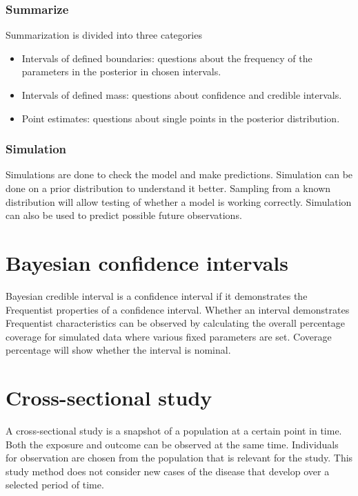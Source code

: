 \subsubsection*{Summarize}

Summarization is divided into three categories

\begin{itemize}
    \item Intervals of defined boundaries: questions about the frequency of the parameters in the posterior in chosen intervals.
    \item Intervals of defined mass: questions about confidence and credible intervals. 
    \item Point estimates: questions about single points in the posterior distribution.
\end{itemize}

\subsubsection*{Simulation}

Simulations are done to check the model and make predictions. Simulation can be done on a prior distribution to understand it better. Sampling from a known distribution will allow testing of whether a model is working correctly. Simulation can also be used to predict possible future observations. \cite{Mcelreath2015StatisticalRA}

\section{Bayesian confidence intervals}\label{BayesianConfidenceIntervals}

Bayesian credible interval is a confidence interval if it demonstrates the Frequentist properties of a confidence interval. Whether an interval demonstrates Frequentist characteristics can be observed by calculating the overall percentage coverage for simulated data where various fixed parameters are set. \cite{Pirikahu2016BayesianMO} \cite{Shi2009BayesianCI} Coverage percentage will show whether the interval is nominal. \cite{Pirikahu2016BayesianMO} 

\section{Cross-sectional study}\label{CrossSectionalStudy}

A cross-sectional study is a snapshot of a population at a certain point in time. Both the exposure and outcome can be observed at the same time. Individuals for observation are chosen from the population that is relevant for the study. This study method does not consider new cases of the disease that develop over a selected period of time. 

